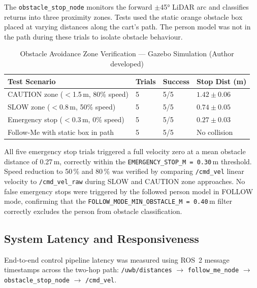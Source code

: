 The \texttt{obstacle\_stop\_node} monitors the forward
$\pm$45° LiDAR arc and classifies returns into three proximity zones.
Tests used the static orange obstacle box placed at varying distances
along the cart's path. The person model was not in the path during
these trials to isolate obstacle behaviour.

\begin{table}[!ht]
\caption{Obstacle Avoidance Zone Verification --- Gazebo Simulation
         (Author developed)}
\label{tab:results_obs}
\centering
\footnotesize
\begin{tabular}{p{2.0cm} p{0.8cm} p{1.2cm} p{1.8cm}}
\toprule
\textbf{Test Scenario} & \textbf{Trials} &
\textbf{Success} & \textbf{Stop Dist (m)} \\
\midrule
CAUTION zone ($<$1.5\,m, 80\% speed) & 5 & 5/5 & $1.42 \pm 0.06$ \\
SLOW zone ($<$0.8\,m, 50\% speed)    & 5 & 5/5 & $0.74 \pm 0.05$ \\
Emergency stop ($<$0.3\,m, 0\% speed) & 5 & 5/5 & $0.27 \pm 0.03$ \\
Follow-Me with static box in path    & 5 & 5/5 & No collision \\
\bottomrule
\end{tabular}
\end{table}

All five emergency stop trials triggered a full velocity zero at a
mean obstacle distance of 0.27\,m, correctly within the
\texttt{EMERGENCY\_STOP\_M = 0.30}\,m threshold. Speed reduction to
50\,\% and 80\,\% was verified by comparing \texttt{/cmd\_vel}
linear velocity to \texttt{/cmd\_vel\_raw} during SLOW and CAUTION
zone approaches. No false emergency stops were triggered by the
followed person model in FOLLOW mode, confirming that the
\texttt{FOLLOW\_MODE\_MIN\_OBSTACLE\_M = 0.40}\,m filter correctly
excludes the person from obstacle classification.

\subsection{System Latency and Responsiveness}

End-to-end control pipeline latency was measured using ROS~2 message
timestamps across the two-hop path:
\texttt{/uwb/distances} $\to$ \texttt{follow\_me\_node}
$\to$ \texttt{obstacle\_stop\_node} $\to$ \texttt{/cmd\_vel}.

